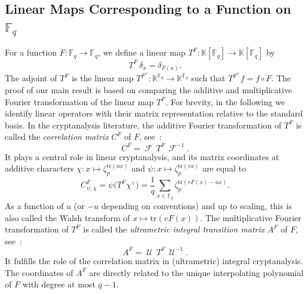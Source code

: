 \documentclass[12pt]{article}
\newcommand{\F}{\mathbb{F}}
\newcommand{\K}{\mathbb{K}}
\newcommand{\tr}{\mathrm{tr}}
\newcommand{\dual}{\vee}
\DeclareMathOperator{\FT}{\mathscr{F}}
\DeclareMathOperator{\UT}{\mathscr{U}}
\begin{document}
\subsection{Linear Maps Corresponding to a Function on \texorpdfstring{$\F_q$}{a Finite Field}}
For a function $F : \F_q \to \F_q$, we define a linear map $T^F : \K[\F_q] \to \K[\F_q]$ by
\begin{equation*}
T^F \,\delta_x = \delta_{F(x)}.
\end{equation*}
The adjoint of $T^F$ is the linear map $T^{F^\dual} : \K^{\F_q} \to \K^{\F_q}$ such that $T^{F^\dual} f = f \circ F$.
The proof of our main result is based on comparing the additive and multiplicative Fourier transformation of the linear map $T^F$.
For brevity, in the following we identify linear operators with their matrix representation relative to the standard basis.
In the cryptanalysis literature, the additive Fourier transformation of $T^F$ is called the \emph{correlation matrix} $C^F$ of $F$, see~\cite{DBLP:conf/fse/DaemenGV94,DBLP:conf/asiacrypt/Beyne21}:
\begin{equation*}
C^F = \FT \,T^F \,\FT^{-1}.
\end{equation*}
It plays a central role in linear cryptanalysis, and its matrix coordinates at additive characters $\chi : x \mapsto \zeta_p^{\tr(ux)}$ and $\psi : x \mapsto \zeta_p^{\tr(vx)}$ are equal to
\begin{equation*}
C^F_{\psi, \chi} = \psi\big(T^F \chi^\dual\big) = \frac{1}{q} \sum_{x \in \F_q} \zeta_p^{\tr(v F(x) - ux)}.
\end{equation*}
As a function of $u$ (or $-u$ depending on conventions) and up to scaling, this is also called the Walsh transform of $x \mapsto \tr(v F(x))$.
The multiplicative Fourier transformation of $T^F$ is called the \emph{ultrametric integral transition matrix} $A^F$ of $F$, see~\cite{DBLP:conf/asiacrypt/BeyneV24,Beyne2023}:
\begin{equation*}
A^F = \UT \,T^F \,\UT^{-1}.
\end{equation*}
It fulfills the role of the correlation matrix in (ultrametric) integral cryptanalysis.
The coordinates of $A^F$ are directly related to the unique interpolating polynomial of $F$ with degree at most $q - 1$.
\end{document}
